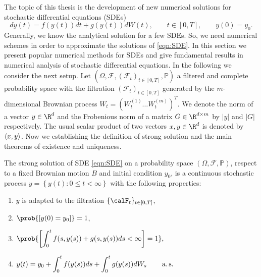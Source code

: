 
	The topic of this thesis is the development of new numerical solutions for stochastic differential equations (SDEs)
\begin{equation}\label{eqn:SDE}
	dy(t) = f(y(t))dt + g(y(t))dW(t), \qquad t\in [0,T], \qquad y(0)=y_0 .
\end{equation}
	Generally, we know the analytical solution for a few SDEs.
So, we need numerical schemes in order to approximate the solutions of \cref{eqn:SDE}. In this section we present  
popular numerical methods for SDEs  and give fundamental results in numerical analysis of stochastic  
differential equations.	 In the following we consider the next setup. Let 
$(\Omega,\mathcal{F},(\mathcal{F}_t)_{t\in[0,T]},\mathbb{P})$  a filtered and complete probability space with
the filtration $(\mathcal{F}_t)_{t\in[0,T]}$ generated by the $m$-dimensional Brownian process 
$W_t=( W_t^{(1)} \ldots W_t^{(m)})^T$. 
We denote  the norm of a vector $y\in \R^d$ and the Frobenious norm 
of a matrix $G\in \R^{d\times m}$  by $|y|$ and $|G|$ respectively. The usual scalar product of two vectors 
$x,y\in \R^d$ is denoted by $\left\langle x, y\right\rangle$. 
Now we establishing the definition of strong solution and the main theorems of  
existence and  uniqueness.

\begin{definition}
	The strong solution of  SDE \eqref{eqn:SDE} on a probability space $(\Omega,\mathcal{F},\mathbb{P})$,
	respect to a fixed Brownian motion $B$ and initial condition $y_0$,
	is a continuous stochastic process $y=\left\{ y(t): 0\leq t<\infty\right\} $
	with the following properties:
	\begin{enumerate}[(SS-1)]
		\item \label{eq:SF1}
			$y$ is adapted to the filtration $\{\calF_{t}\}_{t\in[0,T]}$,
		\item \label{eq:SF2}
			$\prob{[y(0)=y_0]}=1$,
		\item \label{eq:SF3}
		$\displaystyle \prob{\left[\int_{0}^{t}f(s,y(s))+g(s,y(s))ds<\infty\right]=1},$
		\item \label{eq:SF4}
		$
		\displaystyle
			y(t)=y_0+\int_{0}^{t} f(y(s))ds+
		\int_{0}^{t} g(y(s))dW_s
		\qquad \operatorname*{a.s.}
		$
	\end{enumerate}
\end{definition}
	
